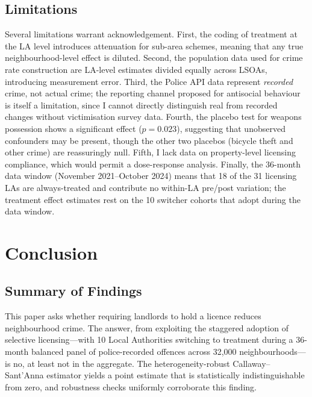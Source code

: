 \documentclass[12pt]{article}
\begin{document}
\subsection{Limitations}

Several limitations warrant acknowledgement. First, the coding of treatment at the LA level introduces attenuation for sub-area schemes, meaning that any true neighbourhood-level effect is diluted. Second, the population data used for crime rate construction are LA-level estimates divided equally across LSOAs, introducing measurement error. Third, the Police API data represent \emph{recorded} crime, not actual crime; the reporting channel proposed for antisocial behaviour is itself a limitation, since I cannot directly distinguish real from recorded changes without victimisation survey data. Fourth, the placebo test for weapons possession shows a significant effect ($p = 0.023$), suggesting that unobserved confounders may be present, though the other two placebos (bicycle theft and other crime) are reassuringly null. Fifth, I lack data on property-level licensing compliance, which would permit a dose-response analysis. Finally, the 36-month data window (November 2021--October 2024) means that 18 of the 31 licensing LAs are always-treated and contribute no within-LA pre/post variation; the treatment effect estimates rest on the 10 switcher cohorts that adopt during the data window.


\section{Conclusion}

\subsection{Summary of Findings}

This paper asks whether requiring landlords to hold a licence reduces neighbourhood crime. The answer, from exploiting the staggered adoption of selective licensing---with 10 Local Authorities switching to treatment during a 36-month balanced panel of police-recorded offences across 32{,}000 neighbourhoods---is no, at least not in the aggregate. The heterogeneity-robust Callaway--Sant'Anna estimator yields a point estimate that is statistically indistinguishable from zero, and robustness checks uniformly corroborate this finding.
\end{document}
